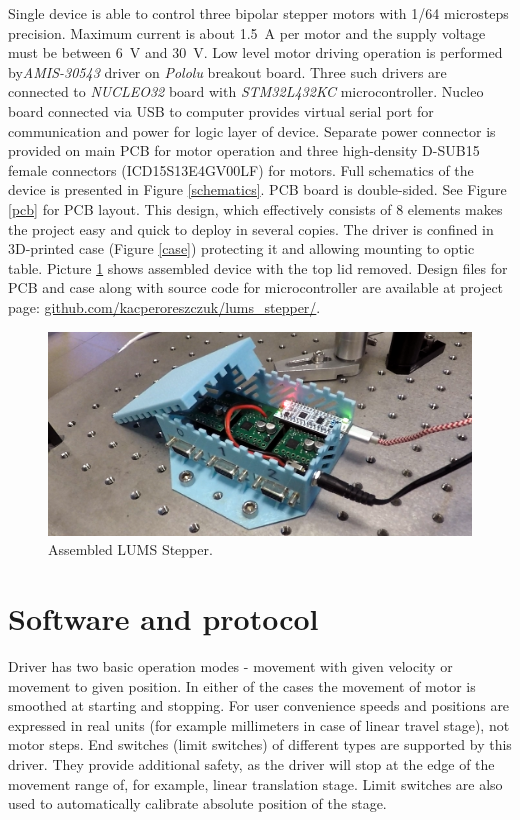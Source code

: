\documentclass[10pt,article]{article}
\begin{document}
Single device is able to control three bipolar stepper motors with 1/64 microsteps precision. Maximum current is about \SI{1.5}{A} per motor and the supply voltage must be between \SI{6}{V} and \SI{30}{V}.
Low level motor driving operation  is performed by\textit{AMIS-30543} driver on \textit{Pololu} breakout board. Three such drivers are connected to \textit{NUCLEO32}  board with \textit{STM32L432KC} microcontroller. Nucleo board connected via USB to computer provides virtual serial port for communication and power for logic layer of device. Separate power connector is provided on main PCB for motor operation and three high-density D-SUB15 female connectors (ICD15S13E4GV00LF) for motors. Full schematics of the device is presented in Figure \ref{schematics}. PCB board is double-sided. See Figure \ref{pcb} for PCB layout. This design, which effectively consists of 8 elements makes the project easy and quick to deploy in several copies. The driver is confined in 3D-printed case (Figure \ref{case}) protecting it and allowing mounting to optic table. Picture \ref{photo} shows assembled device with the top lid removed. Design files for PCB and case along with source code for microcontroller are available at project page: \url{github.com/kacperoreszczuk/lums_stepper/}. 

\begin{figure}[h]
 \centering
 \includegraphics[width = 11.5cm]{photo.png}
\caption {Assembled LUMS Stepper.} \label{photo}
\end{figure}
\newpage
\section{Software and protocol}

Driver has two basic operation modes - movement with given velocity or movement to given position. In either of the cases the movement of motor is smoothed at starting and stopping. For user convenience speeds and positions are expressed in real units (for example millimeters in case of linear travel stage), not motor steps. End switches (limit switches) of different types are supported by this driver. They provide additional safety, as the driver will stop at the edge of the movement range of, for example, linear translation stage. Limit switches are also used to automatically calibrate absolute position of the stage.
\end{document}
